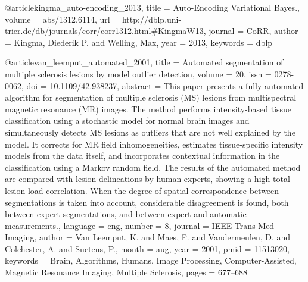 \documentclass{article}
\begin{document}
@article{kingma_auto-encoding_2013,
	title = {Auto-{Encoding} {Variational} {Bayes}.},
	volume = {abs/1312.6114},
	url = {http://dblp.uni-trier.de/db/journals/corr/corr1312.html#KingmaW13},
	journal = {CoRR},
	author = {Kingma, Diederik P. and Welling, Max},
	year = {2013},
	keywords = {dblp}
}

@article{van_leemput_automated_2001,
	title = {Automated segmentation of multiple sclerosis lesions by model outlier detection},
	volume = {20},
	issn = {0278-0062},
	doi = {10.1109/42.938237},
	abstract = {This paper presents a fully automated algorithm for segmentation of multiple sclerosis (MS) lesions from multispectral magnetic resonance (MR) images. The method performs intensity-based tissue classification using a stochastic model for normal brain images and simultaneously detects MS lesions as outliers that are not well explained by the model. It corrects for MR field inhomogeneities, estimates tissue-specific intensity models from the data itself, and incorporates contextual information in the classification using a Markov random field. The results of the automated method are compared with lesion delineations by human experts, showing a high total lesion load correlation. When the degree of spatial correspondence between segmentations is taken into account, considerable disagreement is found, both between expert segmentations, and between expert and automatic measurements.},
	language = {eng},
	number = {8},
	journal = {IEEE Trans Med Imaging},
	author = {Van Leemput, K. and Maes, F. and Vandermeulen, D. and Colchester, A. and Suetens, P.},
	month = aug,
	year = {2001},
	pmid = {11513020},
	keywords = {Brain, Algorithms, Humans, Image Processing, Computer-Assisted, Magnetic Resonance Imaging, Multiple Sclerosis},
	pages = {677--688}
}
\end{document}
